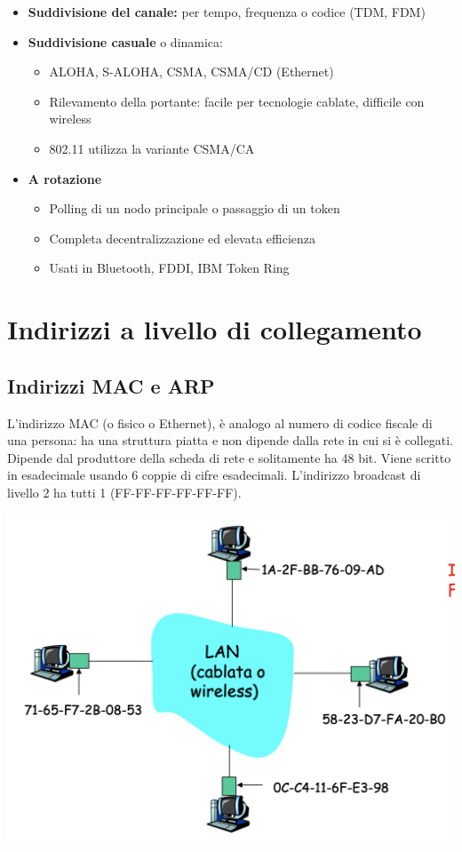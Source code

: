 \documentclass{report}
\begin{document}
\begin{itemize}
\item
  \textbf{Suddivisione del canale:} per tempo, frequenza o codice (TDM,
  FDM)
\item
  \textbf{Suddivisione casuale} o dinamica:

  \begin{itemize}
  \item
    ALOHA, S-ALOHA, CSMA, CSMA/CD (Ethernet)
  \item
    Rilevamento della portante: facile per tecnologie cablate, difficile
    con wireless
  \item
    802.11 utilizza la variante CSMA/CA
  \end{itemize}
\item
  \textbf{A rotazione}

  \begin{itemize}
  \item
    Polling di un nodo principale o passaggio di un token
  \item
    Completa decentralizzazione ed elevata efficienza
  \item
    Usati in Bluetooth, FDDI, IBM Token Ring
  \end{itemize}
\end{itemize}

\hypertarget{header-n109}{%
\section{Indirizzi a livello di collegamento}\label{header-n109}}

\hypertarget{header-n110}{%
\subsection{Indirizzi MAC e ARP}\label{header-n110}}

L'indirizzo MAC (o fisico o Ethernet), è analogo al numero di codice
fiscale di una persona: ha una struttura piatta e non dipende dalla rete
in cui si è collegati. Dipende dal produttore della scheda di rete e
solitamente ha 48 bit. Viene scritto in esadecimale usando 6 coppie di
cifre esadecimali. L'indirizzo broadcast di livello 2 ha tutti 1
(FF-FF-FF-FF-FF-FF).

\begin{center}
		\includegraphics[width=0.7\linewidth]{arp}
	\end{center}
\end{document}
